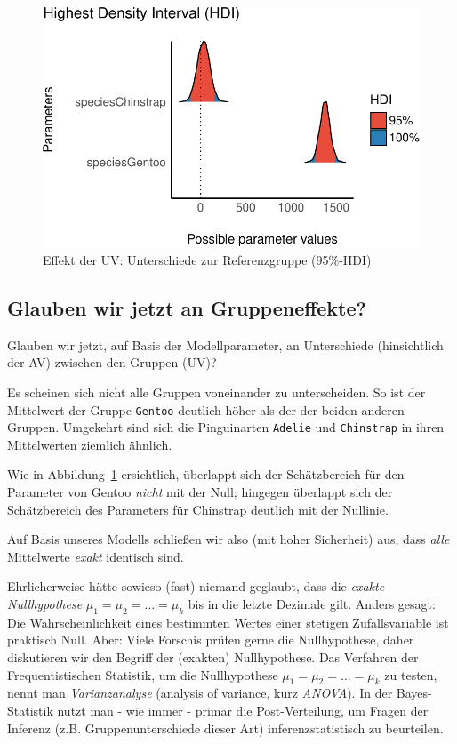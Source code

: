 \documentclass[
  a4paper,
  DIV=11]{scrreprt}
\theoremstyle{definition}
\theoremstyle{remark}
\begin{document}
\begin{figure}[H]

{\centering \includegraphics{./metrische-AV_files/figure-pdf/fig-m106-params-1.pdf}

}

\caption{\label{fig-m106-params}Effekt der UV: Unterschiede zur
Referenzgruppe (95\%-HDI)}

\end{figure}

\hypertarget{glauben-wir-jetzt-an-gruppeneffekte}{%
\subsection{Glauben wir jetzt an
Gruppeneffekte?}\label{glauben-wir-jetzt-an-gruppeneffekte}}

Glauben wir jetzt, auf Basis der Modellparameter, an Unterschiede
(hinsichtlich der AV) zwischen den Gruppen (UV)?

Es scheinen sich nicht alle Gruppen voneinander zu unterscheiden. So ist
der Mittelwert der Gruppe \texttt{Gentoo} deutlich höher als der der
beiden anderen Gruppen. Umgekehrt sind sich die Pinguinarten
\texttt{Adelie} und \texttt{Chinstrap} in ihren Mittelwerten ziemlich
ähnlich.

Wie in Abbildung~\ref{fig-m106-params} ersichtlich, überlappt sich der
Schätzbereich für den Parameter von Gentoo \emph{nicht} mit der Null;
hingegen überlappt sich der Schätzbereich des Parameters für Chinstrap
deutlich mit der Nullinie.

Auf Basis unseres Modells schließen wir also (mit hoher Sicherheit) aus,
dass \emph{alle} Mittelwerte \emph{exakt} identisch sind.

Ehrlicherweise hätte sowieso (fast) niemand geglaubt, dass die
\emph{exakte Nullhypothese} \(\mu_1 = \mu_2 = \ldots = \mu_k\) bis in
die letzte Dezimale gilt. Anders gesagt: Die Wahrscheinlichkeit eines
bestimmten Wertes einer stetigen Zufallsvariable ist praktisch Null.
Aber: Viele Forschis prüfen gerne die Nullhypothese, daher diskutieren
wir den Begriff der (exakten) Nullhypothese. Das Verfahren der
Frequentistischen Statistik, um die Nullhypothese
\(\mu_1 = \mu_2 = \ldots = \mu_k\) zu testen, nennt man
\emph{Varianzanalyse} (analysis of variance, kurz \emph{ANOVA}). In der
Bayes-Statistik nutzt man - wie immer - primär die Post-Verteilung, um
Fragen der Inferenz (z.B. Gruppenunterschiede dieser Art)
inferenzstatistisch zu beurteilen.
\end{document}
